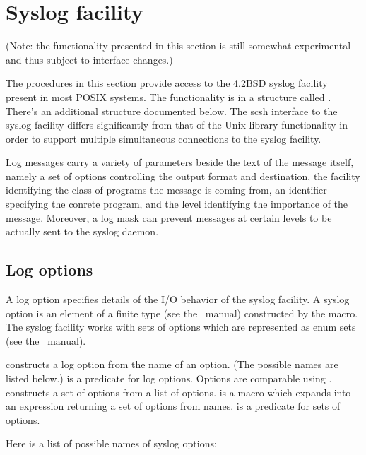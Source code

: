 \section{Syslog facility}
\label{syslog-facility}

(Note: the functionality presented in this section is still somewhat
experimental and thus subject to interface changes.)

The procedures in this section provide access to the 4.2BSD syslog
facility present in most POSIX systems.  The functionality is in a
structure called .  There's an additional structure
 documented below.  The scsh interface to
the syslog facility differs significantly from that of the Unix
library functionality in order to support multiple simultaneous
connections to the syslog facility.

Log messages carry a variety of parameters beside the text of the
message itself, namely a set of options controlling the output format
and destination, the facility identifying the class of programs the
message is coming from, an identifier specifying the conrete program,
and the level identifying the importance of the message.  Moreover, a
log mask can prevent messages at certain levels to be actually sent to
the syslog daemon.

\subsection*{Log options}

A log option specifies details of the I/O behavior of the syslog
facility.  A syslog option is an element of a finite type (see
the \scm~manual) constructed by the
 macro.  The syslog facility works with sets of
options which are represented as enum sets (see
the \scm~manual).






\begin{desc}
 constructs a log option from the name of an
option.  (The possible names are listed below.)  
is a predicate for log options.  Options are comparable using
.   constructs a set of options
from a list of options.   is a macro which
expands into an expression returning a set of options from names.
 is a predicate for sets of options.
\end{desc}
%                               
Here is a list of possible names of syslog options:

